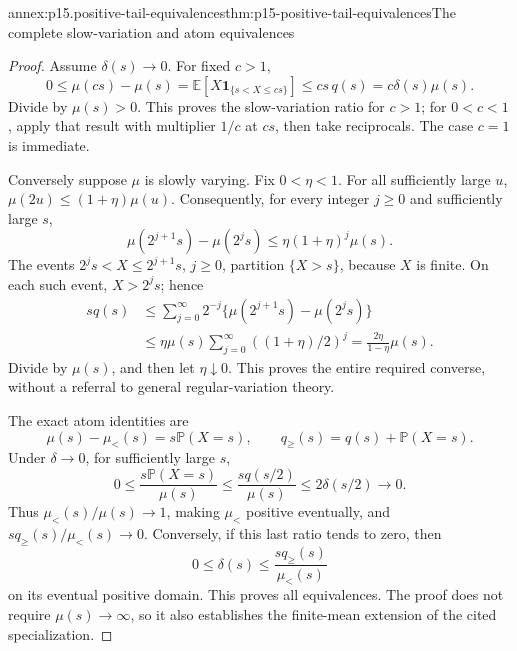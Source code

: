 \begin{annexitem}{annex:p15.positive-tail-equivalences}{thm:p15-positive-tail-equivalences}{The complete slow-variation and atom equivalences}
\begin{proof}
Assume \(\delta(s)\to0\). For fixed \(c>1\),
\[
 0\leq\mu(cs)-\mu(s)
   =\mathbb E[X\mathbf1_{\{s<X\leq cs\}}]
   \leq cs\,q(s)=c\delta(s)\mu(s).
\]
Divide by \(\mu(s)>0\). This proves the slow-variation ratio
for \(c>1\); for \(0<c<1\), apply that result with multiplier
\(1/c\) at \(cs\), then take reciprocals. The case \(c=1\)
is immediate.

Conversely suppose \(\mu\) is slowly varying. Fix \(0<\eta<1\).
For all sufficiently large \(u\),
\(\mu(2u)\leq(1+\eta)\mu(u)\).
Consequently, for every integer \(j\geq0\) and sufficiently
large \(s\),
\[
 \mu(2^{j+1}s)-\mu(2^js)
       \leq\eta(1+\eta)^j\mu(s).
\]
The events \(2^js<X\leq2^{j+1}s\), \(j\geq0\), partition
\(\{X>s\}\), because \(X\) is finite. On each such event,
\(X>2^js\); hence
\[
 \begin{aligned}
 s q(s)
 &\leq\sum_{j=0}^\infty
        2^{-j}\{\mu(2^{j+1}s)-\mu(2^js)\}\\
 &\leq\eta\mu(s)\sum_{j=0}^\infty((1+\eta)/2)^j
   =\frac{2\eta}{1-\eta}\mu(s).
 \end{aligned}
\]
Divide by \(\mu(s)\), and then let \(\eta\downarrow0\).
This proves the entire required converse, without a referral to
general regular-variation theory.

The exact atom identities are
\[
 \mu(s)-\mu_<(s)=s\mathbb P(X=s),\qquad
 q_{\geq}(s)=q(s)+\mathbb P(X=s).
\]
Under \(\delta\to0\), for sufficiently large \(s\),
\[
 0\leq\frac{s\mathbb P(X=s)}{\mu(s)}
 \leq\frac{s q(s/2)}{\mu(s)}
 \leq2\delta(s/2)\longrightarrow0.
\]
Thus \(\mu_<(s)/\mu(s)\to1\), making \(\mu_<\) positive
eventually, and
\(s q_{\geq}(s)/\mu_<(s)\to0\).
Conversely, if this last ratio tends to zero, then
\[
 0\leq\delta(s)
 \leq\frac{s q_{\geq}(s)}{\mu_<(s)}
\]
on its eventual positive domain. This proves all equivalences.
The proof does not require \(\mu(s)\to\infty\), so it also
establishes the finite-mean extension of the cited specialization.
\end{proof}
\end{annexitem}

